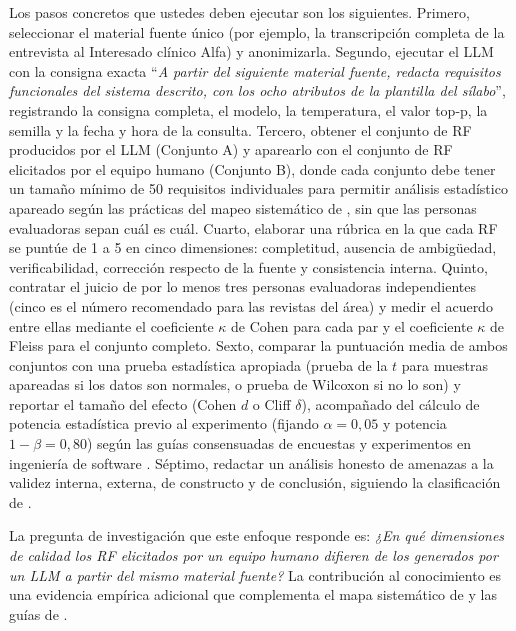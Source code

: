 \documentclass[11pt,a4paper]{article}
\begin{document}
Los pasos concretos que ustedes deben ejecutar son los siguientes.
Primero, seleccionar el material fuente único (por ejemplo, la transcripción completa de la entrevista al Interesado clínico Alfa) y anonimizarla.
Segundo, ejecutar el LLM con la consigna exacta ``\emph{A partir del siguiente material fuente, redacta requisitos funcionales del sistema descrito, con los ocho atributos de la plantilla del sílabo}'', registrando la consigna completa, el modelo, la temperatura, el valor top-p, la semilla y la fecha y hora de la consulta.
Tercero, obtener el conjunto de RF producidos por el LLM (Conjunto A) y aparearlo con el conjunto de RF elicitados por el equipo humano (Conjunto B), donde cada conjunto debe tener un tamaño mínimo de 50 requisitos individuales para permitir análisis estadístico apareado según las prácticas del mapeo sistemático de \cite{montgomery2022requirements}, sin que las personas evaluadoras sepan cuál es cuál.
Cuarto, elaborar una rúbrica en la que cada RF se puntúe de 1 a 5 en cinco dimensiones: completitud, ausencia de ambigüedad, verificabilidad, corrección respecto de la fuente y consistencia interna.
Quinto, contratar el juicio de por lo menos tres personas evaluadoras independientes (cinco es el número recomendado para las revistas del área) y medir el acuerdo entre ellas mediante el coeficiente $\kappa$ de Cohen \cite{cohen1960kappa} para cada par y el coeficiente $\kappa$ de Fleiss \cite{fleiss1971kappa} para el conjunto completo.
Sexto, comparar la puntuación media de ambos conjuntos con una prueba estadística apropiada (prueba de la $t$ para muestras apareadas si los datos son normales, o prueba de Wilcoxon si no lo son) y reportar el tamaño del efecto (Cohen $d$ o Cliff $\delta$), acompañado del cálculo de potencia estadística previo al experimento (fijando $\alpha = 0{,}05$ y potencia $1-\beta = 0{,}80$) según las guías consensuadas de encuestas y experimentos en ingeniería de software \cite{molleri2020checklist}.
Séptimo, redactar un análisis honesto de amenazas a la validez interna, externa, de constructo y de conclusión, siguiendo la clasificación de \cite{wohlin2012experimentation}.

La pregunta de investigación que este enfoque responde es: \emph{¿En qué dimensiones de calidad los RF elicitados por un equipo humano difieren de los generados por un LLM a partir del mismo material fuente?}
La contribución al conocimiento es una evidencia empírica adicional que complementa el mapa sistemático de \cite{cheng2026genai} y las guías de \cite{vogelsang2024llm}.
\end{document}
